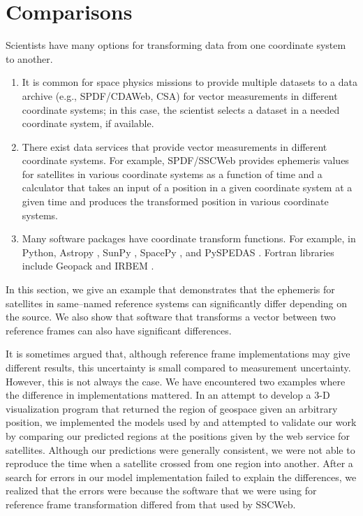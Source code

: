 \documentclass[draft]{agujournal2019}
\begin{document}
\section{Comparisons}
\label{sect:comparisons}

Scientists have many options for transforming data from one coordinate system to another.

\begin{enumerate}

    \parskip 0.1in 

    \item It is common for space physics missions to provide multiple datasets to a data archive (e.g., SPDF/CDAWeb, CSA) for vector measurements in different coordinate systems; in this case, the scientist selects a dataset in a needed coordinate system, if available.

    \item There exist data services that provide vector measurements in different coordinate systems. For example, SPDF/SSCWeb provides ephemeris values for satellites in various coordinate systems as a function of time and a calculator that takes an input of a position in a given coordinate system at a given time and produces the transformed position in various coordinate systems. 

    \item Many software packages have coordinate transform functions. For example, in Python, Astropy \cite{AstroPy2022}, SunPy \cite{SunPy}, SpacePy \cite{SpacePy}, and PySPEDAS \cite{Angelopoulos2024}. Fortran libraries include Geopack \cite{Tsyganenko2008} and IRBEM \cite{IRBEM2022}.

\end{enumerate}

In this section, we give an example that demonstrates that the ephemeris for satellites in same--named reference systems can significantly differ depending on the source. We also show that software that transforms a vector between two reference frames can also have significant differences.

It is sometimes argued that, although reference frame implementations may give different results, this uncertainty is small compared to measurement uncertainty. However, this is not always the case. We have encountered two examples where the difference in implementations mattered. In an attempt to develop a 3-D visualization program that returned the region of geospace given an arbitrary position, we implemented the models used by \cite{SSCWeb} and attempted to validate our work by comparing our predicted regions at the positions given by the web service for satellites. Although our predictions were generally consistent, we were not able to reproduce the time when a satellite crossed from one region into another. After a search for errors in our model implementation failed to explain the differences, we realized that the errors were because the software that we were using for reference frame transformation differed from that used by SSCWeb.
\end{document}
